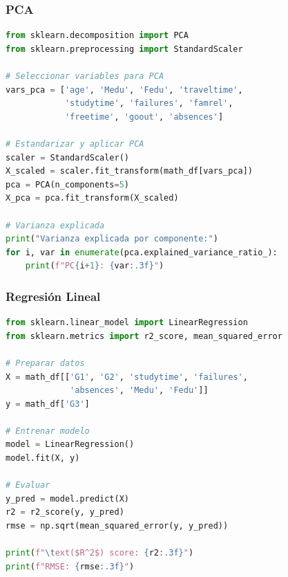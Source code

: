 \documentclass[a4paper,12pt]{article}
\begin{document}
\subsubsection{PCA}
\begin{lstlisting}[language=Python]
from sklearn.decomposition import PCA
from sklearn.preprocessing import StandardScaler

# Seleccionar variables para PCA
vars_pca = ['age', 'Medu', 'Fedu', 'traveltime', 
            'studytime', 'failures', 'famrel', 
            'freetime', 'goout', 'absences']

# Estandarizar y aplicar PCA
scaler = StandardScaler()
X_scaled = scaler.fit_transform(math_df[vars_pca])
pca = PCA(n_components=5)
X_pca = pca.fit_transform(X_scaled)

# Varianza explicada
print("Varianza explicada por componente:")
for i, var in enumerate(pca.explained_variance_ratio_):
    print(f"PC{i+1}: {var:.3f}")
\end{lstlisting}

\subsubsection{Regresión Lineal}
\begin{lstlisting}[language=Python]
from sklearn.linear_model import LinearRegression
from sklearn.metrics import r2_score, mean_squared_error

# Preparar datos
X = math_df[['G1', 'G2', 'studytime', 'failures', 
             'absences', 'Medu', 'Fedu']]
y = math_df['G3']

# Entrenar modelo
model = LinearRegression()
model.fit(X, y)

# Evaluar
y_pred = model.predict(X)
r2 = r2_score(y, y_pred)
rmse = np.sqrt(mean_squared_error(y, y_pred))

print(f"\text($R^2$) score: {r2:.3f}")
print(f"RMSE: {rmse:.3f}")
\end{lstlisting}
\end{document}
